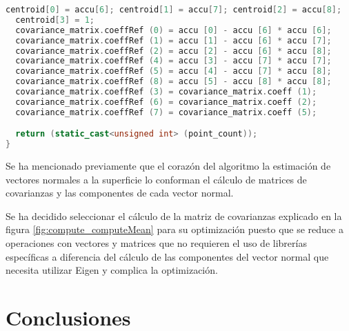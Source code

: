  \begin{lstlisting}[language=C++,breaklines]
  centroid[0] = accu[6]; centroid[1] = accu[7]; centroid[2] = accu[8];
  centroid[3] = 1;
  covariance_matrix.coeffRef (0) = accu [0] - accu [6] * accu [6];
  covariance_matrix.coeffRef (1) = accu [1] - accu [6] * accu [7];
  covariance_matrix.coeffRef (2) = accu [2] - accu [6] * accu [8];
  covariance_matrix.coeffRef (4) = accu [3] - accu [7] * accu [7];
  covariance_matrix.coeffRef (5) = accu [4] - accu [7] * accu [8];
  covariance_matrix.coeffRef (8) = accu [5] - accu [8] * accu [8];
  covariance_matrix.coeffRef (3) = covariance_matrix.coeff (1);
  covariance_matrix.coeffRef (6) = covariance_matrix.coeff (2);
  covariance_matrix.coeffRef (7) = covariance_matrix.coeff (5);

  return (static_cast<unsigned int> (point_count));
}
\end{lstlisting}

Se ha mencionado previamente que el corazón del algoritmo la estimación de vectores normales a la superficie lo conforman el cálculo de matrices de covarianzas y las componentes de cada vector normal.

Se ha decidido seleccionar el cálculo de la matriz de covarianzas explicado en la figura \ref{fig:compute_computeMean} para su optimización puesto que se reduce a operaciones con vectores y matrices que no requieren el uso de librerías específicas a diferencia del cálculo de las componentes del vector normal que necesita utilizar Eigen y complica la optimización.

\section{Conclusiones}


